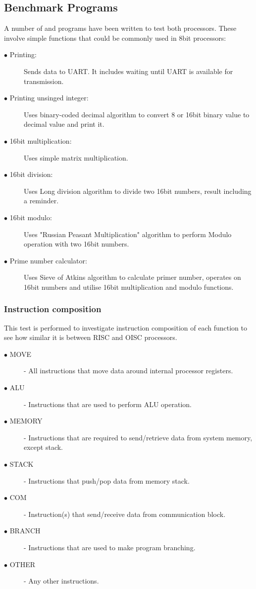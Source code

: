 \subsection{Benchmark Programs}
A number of and programs have been written to test both processors. These involve simple functions that could be commonly used in 8bit processors:

\begin{description}
	\item[$\bullet$ Printing:] Sends data to UART. It includes waiting until UART is available for transmission. 
	\item[$\bullet$ Printing unsinged integer:] Uses binary-coded decimal algorithm to convert 8 or 16bit binary value to decimal value and print it. 
	\item[$\bullet$ 16bit multiplication:] Uses simple matrix multiplication. 
	\item[$\bullet$ 16bit division:] Uses Long division algorithm to divide two 16bit numbers, result including a reminder.
	\item[$\bullet$ 16bit modulo:] Uses "Russian Peasant Multiplication" algorithm to perform Modulo operation with two 16bit numbers.
	\item[$\bullet$ Prime number calculator:] Uses Sieve of Atkins algorithm \autocite{morain_1989} to calculate primer number, operates on 16bit numbers and utilise 16bit multiplication and modulo functions. 
\end{description}


\subsubsection{Instruction composition}\label{subsec:instr_comp}

This test is performed to investigate instruction composition of each function to see how similar it is between RISC and OISC processors. 
\begin{description}
	\item[$\bullet$ MOVE] - All instructions that move data around internal processor registers.
	\item[$\bullet$ ALU] - Instructions that are used to perform ALU operation.
	\item[$\bullet$ MEMORY] - Instructions that are required to send/retrieve data from system memory, except stack.
	\item[$\bullet$ STACK] - Instructions that push/pop data from memory stack.
	\item[$\bullet$ COM] - Instruction(s) that send/receive data from communication block.
	\item[$\bullet$ BRANCH] - Instructions that are used to make program branching.
	\item[$\bullet$ OTHER] - Any other instructions.
\end{description}

